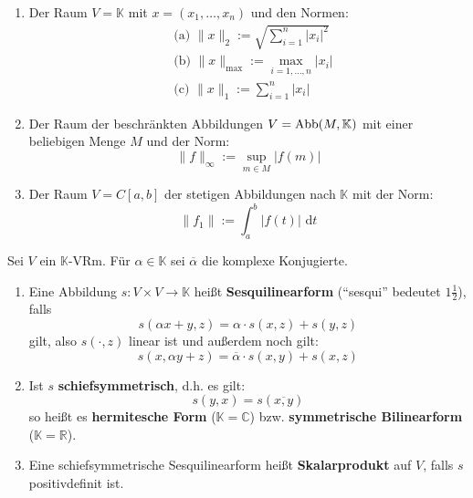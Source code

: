 \documentclass[parskip,a4paper,twoside,DIV15,BCOR12mm]{scrbook}
\begin{document}
\begin{example}
\begin{enumerate}
\item Der Raum $V=\mathbb{K}$ mit $x=(x_1,\ldots,x_n)$ und den Normen:
\begin{align*}
&\text{(a) }\|x\|_2:=\sqrt{\sum_{i=1}^n |x_i|^2}\\
&\text{(b) }\|x\|_{\max}:= \max_{i=1,\ldots,n}|x_i|\\
&\text{(c) }\|x\|_1:=\sum_{i=1}^n |x_i|
\end{align*}
\item Der Raum der beschränkten Abbildungen $V=\operatorname{Abb}(M,\mathbb{K})$ mit einer 
beliebigen Menge $M$ und der Norm:
\[\|f\|_\infty := \sup_{m\in M}|f(m)|\]
\item Der Raum $V=C[a,b]$ der stetigen Abbildungen nach $\mathbb{K}$ mit der Norm:
\[\|f_1\|:=\int_a^b |f(t)|\text{ d}t\]
\end{enumerate}
\end{example}

\begin{comment}
\begin{enumerate}
\item Jeder normierte Raum $(V,\|\cdot\|)$ besitzt die Metrik:
\[d(x,y):=\|x-y\|\]
\item In der Linearen Algebra tauchen hauptsächlich Normen auf, die mit
\textbf{Skalarprodukten} definiert werden.
\end{enumerate}
\end{comment}

\begin{definition}
\renewcommand{\labelenumi}{(\alph{enumi})}
Sei $V$ ein $\mathbb{K}$-VRm. Für $\alpha\in\mathbb{K}$ sei $\overline\alpha$
die komplexe Konjugierte.
\begin{enumerate}
\item Eine Abbildung $s:V\times V\to\mathbb{K}$ heißt \textbf{Sesquilinearform}
("`sesqui"' bedeutet $1\frac12$), falls
\[s(\alpha x+y,z)=\alpha \cdot s(x,z)+s(y,z)\]
gilt, also $s(\cdot,z)$ linear ist und außerdem noch gilt:
\[s(x,\alpha y+z)=\overline\alpha \cdot s(x,y)+s(x,z)\]
\item Ist $s$ \textbf{schiefsymmetrisch}, d.h. es gilt:
\[s(y,x)=s(\overline{x,y})\]
so heißt es \textbf{hermitesche Form} ($\mathbb{K}=\mathbb{C}$) bzw.
\textbf{symmetrische Bilinearform} ($\mathbb{K}=\mathbb{R}$).
\item Eine schiefsymmetrische Sesquilinearform heißt \textbf{Skalarprodukt} auf $V$,
falls $s$ positivdefinit ist.
\end{enumerate}
\renewcommand{\labelenumi}{(\arabic{enumi})}
\end{definition}
\end{document}
